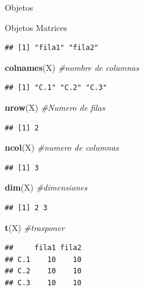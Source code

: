 \documentclass[
  ignorenonframetext,
]{beamer}
\newenvironment{Shaded}{\begin{snugshade}}{\end{snugshade}}
\newcommand{\CommentTok}[1]{\textcolor[rgb]{0.56,0.35,0.01}{\textit{#1}}}
\newcommand{\FunctionTok}[1]{\textcolor[rgb]{0.13,0.29,0.53}{\textbf{#1}}}
\newcommand{\NormalTok}[1]{#1}
\begin{document}
\begin{frame}[fragile]{Objetos}
\begin{block}{Objetos \textbar{} Matrices}
\begin{verbatim}
## [1] "fila1" "fila2"
\end{verbatim}

\begin{Shaded}
\begin{Highlighting}[]
\FunctionTok{colnames}\NormalTok{(X) }\CommentTok{\#nombre de columnas}
\end{Highlighting}
\end{Shaded}

\begin{verbatim}
## [1] "C.1" "C.2" "C.3"
\end{verbatim}

\begin{Shaded}
\begin{Highlighting}[]
\FunctionTok{nrow}\NormalTok{(X) }\CommentTok{\#Numero de filas}
\end{Highlighting}
\end{Shaded}

\begin{verbatim}
## [1] 2
\end{verbatim}

\begin{Shaded}
\begin{Highlighting}[]
\FunctionTok{ncol}\NormalTok{(X) }\CommentTok{\#numero de columnas}
\end{Highlighting}
\end{Shaded}

\begin{verbatim}
## [1] 3
\end{verbatim}

\begin{Shaded}
\begin{Highlighting}[]
\FunctionTok{dim}\NormalTok{(X) }\CommentTok{\#dimensiones}
\end{Highlighting}
\end{Shaded}

\begin{verbatim}
## [1] 2 3
\end{verbatim}

\begin{Shaded}
\begin{Highlighting}[]
\FunctionTok{t}\NormalTok{(X) }\CommentTok{\#trasponer}
\end{Highlighting}
\end{Shaded}

\begin{verbatim}
##     fila1 fila2
## C.1    10    10
## C.2    10    10
## C.3    10    10
\end{verbatim}
\end{block}
\end{frame}
\end{document}
